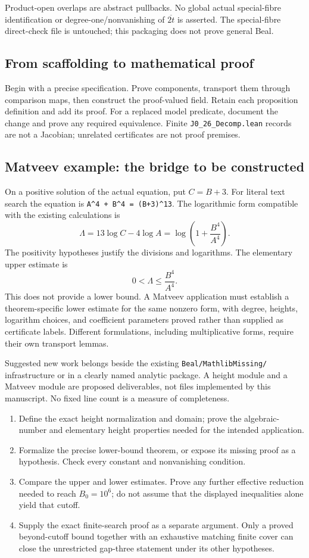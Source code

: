 \documentclass[12pt]{amsart}
\renewcommand{\texttt}[1]{\ifmmode
  \mbox{\small\upshape\nolinkurl{#1}}\else{\small\upshape\nolinkurl{#1}}\fi}
\begin{document}
Product-open overlaps are abstract pullbacks. No global actual
special-fibre identification or degree-one/nonvanishing of
$\overline{2t}$ is asserted. The special-fibre direct-check file
is untouched; this packaging does not prove general Beal.

\subsection{From scaffolding to mathematical proof}
Begin with a precise specification. Prove components, transport
them through comparison maps, then construct the proof-valued field.
Retain each proposition definition and add its proof.
For a replaced model predicate, document the change and prove
any required equivalence. Finite \texttt{J0_26_Decomp.lean} records
are not a Jacobian; unrelated certificates are not proof premises.

\clearpage
\subsection{Matveev example: the bridge to be constructed}
On a positive solution of the actual equation, put $C=B+3$.
For literal text search the equation is
\texttt{A^4 + B^4 = (B+3)^13}.
The logarithmic form compatible with the existing calculations is
\[
 \Lambda=13\log C-4\log A
        =\log\!\left(1+\frac{B^4}{A^4}\right).
\]
The positivity hypotheses justify the divisions and logarithms.
The elementary upper estimate is
\[
 0<\Lambda\le \frac{B^4}{A^4}.
\]
This does not provide a lower bound. A Matveev application must
establish a theorem-specific lower estimate for the same nonzero
form, with degree, heights, logarithm choices, and coefficient
parameters proved rather than supplied as certificate labels.
Different formulations, including multiplicative forms, require
their own transport lemmas.

Suggested new work belongs beside the existing
\texttt{Beal/MathlibMissing/} infrastructure or in a clearly named
analytic package. A height module and a Matveev module are
proposed deliverables, not files implemented by this manuscript.
No fixed line count is a measure of completeness.
\begin{enumerate}[leftmargin=*,itemsep=3pt]
\item Define the exact height normalization and domain; prove
the algebraic-number and elementary height properties needed
for the intended application.
\item Formalize the precise lower-bound theorem, or expose its
missing proof as a hypothesis. Check every constant and
nonvanishing condition.
\item Compare the upper and lower estimates. Prove any further
effective reduction needed to reach $B_0=10^6$; do not assume
that the displayed inequalities alone yield that cutoff.
\item Supply the exact finite-search proof as a separate argument.
Only a proved beyond-cutoff bound together with an exhaustive
matching finite cover can close the unrestricted gap-three
statement under its other hypotheses.
\end{enumerate}
\end{document}
